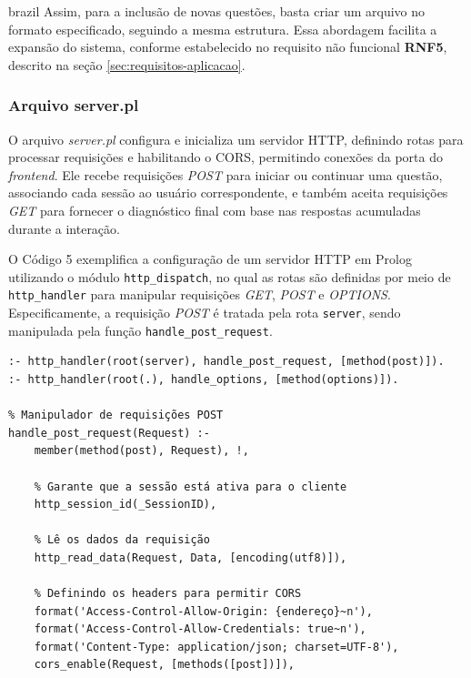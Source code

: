 \begin{otherlanguage*}{brazil}
Assim, para a inclusão de novas questões, basta criar um arquivo no formato especificado, seguindo a mesma estrutura.  Essa abordagem facilita a expansão do sistema, conforme estabelecido no requisito não funcional \textbf{RNF5}, descrito na seção \ref{sec:requisitos-aplicacao}.

\subsubsection{Arquivo server.pl}


O arquivo \textit{server.pl} configura e inicializa um servidor HTTP, definindo rotas para processar requisições e habilitando o CORS, permitindo conexões da porta do \textit{frontend}. Ele recebe requisições \textit{POST} para iniciar ou continuar uma questão, associando cada sessão ao usuário correspondente, e também aceita requisições \textit{GET} para fornecer o diagnóstico final com base nas respostas acumuladas durante a interação.

O Código 5 exemplifica a configuração de um servidor HTTP em Prolog utilizando o módulo \texttt{http\_dispatch}, no qual as rotas são definidas por meio de \texttt{http\_handler} para manipular requisições \textit{GET}, \textit{POST} e \textit{OPTIONS}. Especificamente, a requisição \textit{POST} é tratada pela rota \texttt{server}, sendo manipulada pela função \texttt{handle\_post\_request}.

\begin{lstlisting}[style=ufscthesisx_style, caption={Arquivo \textit{server.pl} - \textit{Handlers} e Manipuladores de requisições}]
% Define o handler para receber as requisições HTTP POST
:- http_handler(root(server), handle_post_request, [method(post)]).
:- http_handler(root(.), handle_options, [method(options)]).

% Manipulador de requisições POST
handle_post_request(Request) :-
    member(method(post), Request), !,
    
    % Garante que a sessão está ativa para o cliente
    http_session_id(_SessionID),

    % Lê os dados da requisição
    http_read_data(Request, Data, [encoding(utf8)]),

    % Definindo os headers para permitir CORS
    format('Access-Control-Allow-Origin: {endereço}~n'),
    format('Access-Control-Allow-Credentials: true~n'),
    format('Content-Type: application/json; charset=UTF-8'),
    cors_enable(Request, [methods([post])]),


\end{lstlisting}
\end{otherlanguage*}
